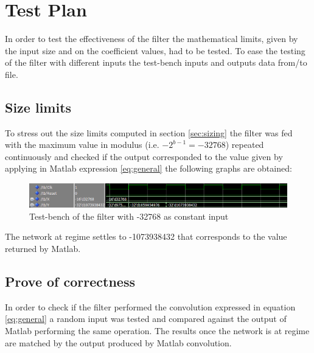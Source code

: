 \section{Test Plan}
In order to test the effectiveness of the filter the mathematical limits, given by the input size and on the coefficient values, had to be tested.
To ease the testing of the filter with different inputs the test-bench inputs and outputs data from/to file.
\subsection{Size limits}
To stress out the size limits computed in section \ref{sec:sizing} the filter was fed with the maximum value in modulus (i.e. $-2^{b-1}= -32768 $) repeated continuously and checked if the output corresponded to the value given by applying in Matlab expression \ref{eq:general} the following graphs are obtained:
\begin{figure}[H]
  \centering
  \includegraphics[width=0.9\linewidth]{./images/simul32768.PNG}
  \caption{Test-bench of the filter with -32768 as constant input}
  \label{fig:32768}
\end{figure}
The network at regime settles to -1073938432 that corresponds to the value returned by Matlab.
\subsection{Prove of correctness}
In order to check if the filter performed the convolution expressed in equation \ref{eq:general} a random input was tested and compared against the output of Matlab performing the same operation. The results once the network is at regime are matched by the output produced by Matlab convolution.
